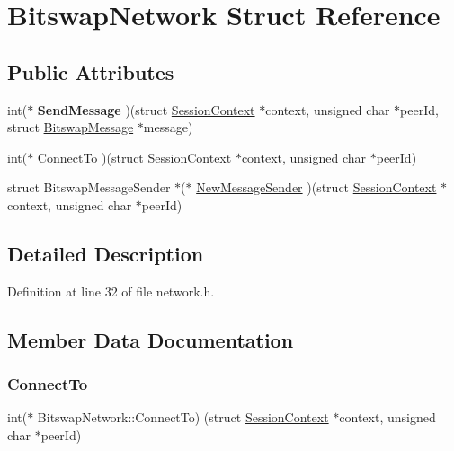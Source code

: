 \hypertarget{struct_bitswap_network}{}\section{Bitswap\+Network Struct Reference}
\label{struct_bitswap_network}
\subsection*{Public Attributes}
\begin{DoxyCompactItemize}
\item 
\mbox{\label{struct_bitswap_network_a3c3e53d8c6376cddeab430dfe1cbfc58}} 
int($\ast$ {\bfseries Send\+Message} )(struct \mbox{\hyperlink{struct_session_context}{Session\+Context}} $\ast$context, unsigned char $\ast$peer\+Id, struct \mbox{\hyperlink{struct_bitswap_message}{Bitswap\+Message}} $\ast$message)
\item 
int($\ast$ \mbox{\hyperlink{struct_bitswap_network_aa80d7084364581f0294078a4ba8a8175}{Connect\+To}} )(struct \mbox{\hyperlink{struct_session_context}{Session\+Context}} $\ast$context, unsigned char $\ast$peer\+Id)
\item 
struct Bitswap\+Message\+Sender $\ast$($\ast$ \mbox{\hyperlink{struct_bitswap_network_aa78d893bcaca0ce49c7e9ba515a8474b}{New\+Message\+Sender}} )(struct \mbox{\hyperlink{struct_session_context}{Session\+Context}} $\ast$context, unsigned char $\ast$peer\+Id)
\end{DoxyCompactItemize}


\subsection{Detailed Description}


Definition at line 32 of file network.\+h.



\subsection{Member Data Documentation}
\mbox{\label{struct_bitswap_network_aa80d7084364581f0294078a4ba8a8175}} 
\subsubsection{\texorpdfstring{Connect\+To}{ConnectTo}}
{\footnotesize\ttfamily int($\ast$ Bitswap\+Network\+::\+Connect\+To) (struct \mbox{\hyperlink{struct_session_context}{Session\+Context}} $\ast$context, unsigned char $\ast$peer\+Id)}

